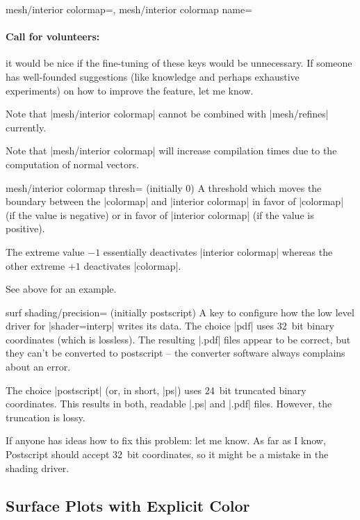 {{\begin{pgfplotskeylist}{%
    mesh/interior colormap=,%
    mesh/interior colormap name=%
}
    \paragraph{Call for volunteers:}

    it would be nice if the fine-tuning of these keys would be unnecessary. If
    someone has well-founded suggestions (like knowledge and perhaps exhaustive
    experiments) on how to improve the feature, let me know.

    Note that |mesh/interior colormap| cannot be combined with |mesh/refines|
    currently.

    Note that |mesh/interior colormap| will increase compilation times due to
    the computation of normal vectors.
\end{pgfplotskeylist}

\begin{pgfplotskey}{mesh/interior colormap thresh= (initially 0)}
    A threshold which moves the boundary between the |colormap| and
    |interior colormap| in favor of |colormap| (if the value is negative) or in
    favor of |interior colormap| (if the value is positive).

    The extreme value $-1$ essentially deactivates |interior colormap| whereas
    the other extreme $+1$ deactivates |colormap|.

    See above for an example.
\end{pgfplotskey}
}

\begin{pgfplotskey}{surf shading/precision= (initially postscript)}
    A key to configure how the low level driver for |shader=interp| writes its
    data. The choice |pdf| uses 32~bit binary coordinates (which is lossless).
    The resulting |.pdf| files appear to be correct, but they can't be
    converted to postscript -- the converter software always complains about an
    error.

    The choice |postscript| (or, in short, |ps|) uses 24~bit truncated binary
    coordinates. This results in both, readable |.ps| and |.pdf| files.
    However, the truncation is lossy.

    If anyone has ideas how to fix this problem: let me know. As far as I know,
    Postscript should accept 32~bit coordinates, so it might be a mistake in
    the shading driver.
\end{pgfplotskey}


\subsection{Surface Plots with Explicit Color}

}
